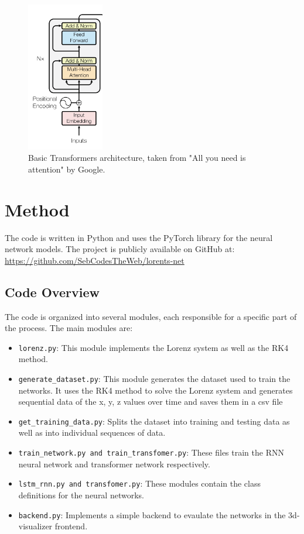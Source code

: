 \documentclass[11pt]{article}
\begin{document}
\begin{figure}[h]
\centering
\includegraphics[width=0.3\textwidth]{transformer-basic.png}
\caption{Basic Transformers architecture, taken from "All you need is attention" by Google. }
\end{figure}

\section{Method}
The code is written in Python and uses the PyTorch library for the neural network models. The project is publicly available on GitHub at: \url{https://github.com/SebCodesTheWeb/lorents-net}


\subsection{Code Overview}

The code is organized into several modules, each responsible for a specific part of the process. The main modules are:

\begin{itemize}
\item \texttt{lorenz.py}: This module implements the Lorenz system as well as the RK4 method.

\item \texttt{generate\_dataset.py}: This module generates the dataset used to train the networks. It uses the RK4 method to solve the Lorenz system and generates sequential data of the x, y, z values over time and saves them in a csv file

\item \texttt{get\_training\_data.py}: Splits the dataset into training and testing data as well as into individual sequences of data.

\item \texttt{train\_network.py and train\_transfomer.py}: These files train the RNN neural network and transformer network respectively.

\item \texttt{lstm\_rnn.py and transfomer.py}: These modules contain the class definitions for the neural networks. 

\item \texttt{backend.py}: Implements a simple backend to evaulate the networks in the 3d-visualizer frontend.

\end{itemize}
\end{document}
